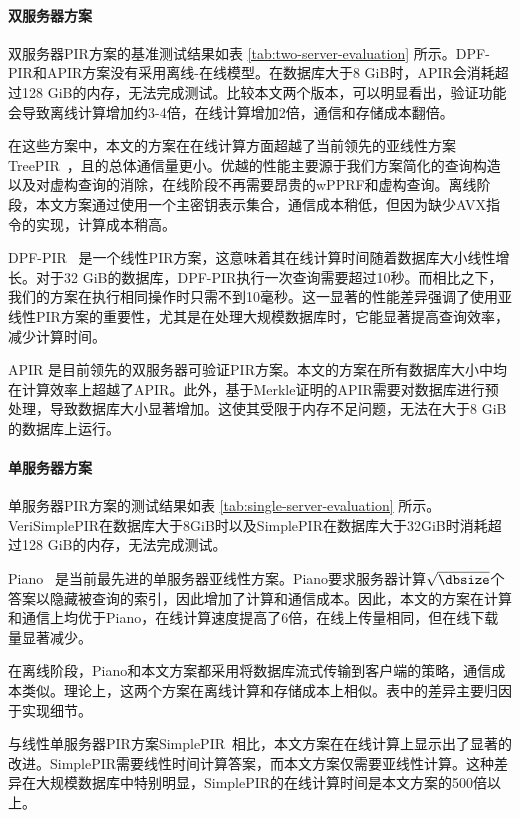 \paragraph{双服务器方案}
双服务器PIR方案的基准测试结果如表 \ref{tab:two-server-evaluation} 所示。DPF-PIR和APIR方案没有采用离线-在线模型。在数据库大于8 GiB时，APIR会消耗超过128 GiB的内存，无法完成测试。比较本文两个版本，可以明显看出，验证功能会导致离线计算增加约3-4倍，在线计算增加2倍，通信和存储成本翻倍。

在这些方案中，本文的方案在在线计算方面超越了当前领先的亚线性方案TreePIR~\cite{C:LazPap23}，且的总体通信量更小。优越的性能主要源于我们方案简化的查询构造以及对虚构查询的消除，在线阶段不再需要昂贵的wPPRF和虚构查询。离线阶段，本文方案通过使用一个主密钥表示集合，通信成本稍低，但因为缺少AVX指令的实现，计算成本稍高。

DPF-PIR~\cite{EC:GilIsh14} 是一个线性PIR方案，这意味着其在线计算时间随着数据库大小线性增长。对于32 GiB的数据库，DPF-PIR执行一次查询需要超过10秒。而相比之下，我们的方案在执行相同操作时只需不到10毫秒。这一显著的性能差异强调了使用亚线性PIR方案的重要性，尤其是在处理大规模数据库时，它能显著提高查询效率，减少计算时间。

APIR \cite{APIR} 是目前领先的双服务器可验证PIR方案。本文的方案在所有数据库大小中均在计算效率上超越了APIR。此外，基于Merkle证明的APIR需要对数据库进行预处理，导致数据库大小显著增加。这使其受限于内存不足问题，无法在大于8 GiB的数据库上运行。

\paragraph{单服务器方案}
单服务器PIR方案的测试结果如表 \ref{tab:single-server-evaluation} 所示。VeriSimplePIR在数据库大于8GiB时以及SimplePIR在数据库大于32GiB时消耗超过128 GiB的内存，无法完成测试。

Piano~\cite{Piano} 是当前最先进的单服务器亚线性方案。Piano要求服务器计算$\sqrt{\dbsize}$个答案以隐藏被查询的索引，因此增加了计算和通信成本。因此，本文的方案在计算和通信上均优于Piano，在线计算速度提高了6倍，在线上传量相同，但在线下载量显著减少。

在离线阶段，Piano和本文方案都采用将数据库流式传输到客户端的策略，通信成本类似。理论上，这两个方案在离线计算和存储成本上相似。表中的差异主要归因于实现细节。

与线性单服务器PIR方案SimplePIR~\cite{SimplePIR}相比，本文方案在在线计算上显示出了显著的改进。SimplePIR需要线性时间计算答案，而本文方案仅需要亚线性计算。这种差异在大规模数据库中特别明显，SimplePIR的在线计算时间是本文方案的500倍以上。

